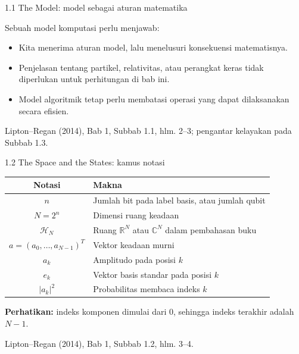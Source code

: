 \documentclass[aspectratio=169,11pt]{beamer}
\newcommand{\C}{\mathbb C}
\newcommand{\R}{\mathbb R}
\newcommand{\bookref}[1]{\par\vfill{\scriptsize\color{gray}Lipton--Regan (2014), Bab 1, #1.}}
\begin{document}
\begin{frame}{1.1 The Model: model sebagai aturan matematika}

Sebuah model komputasi perlu menjawab:
\begin{center}
\end{center}
\begin{itemize}
\item Kita menerima aturan model, lalu menelusuri konsekuensi matematisnya.
\item Penjelasan tentang partikel, relativitas, atau perangkat keras tidak diperlukan untuk perhitungan di bab ini.
\item Model algoritmik tetap perlu membatasi operasi yang dapat dilaksanakan secara efisien.
\end{itemize}
\bookref{Subbab 1.1, hlm. 2--3; pengantar kelayakan pada Subbab 1.3}

\end{frame}

\begin{frame}{1.2 The Space and the States: kamus notasi}

\begin{center}
\begin{tabular}{cl}\toprule
Notasi & Makna\\\midrule
$n$ & Jumlah bit pada label basis, atau jumlah qubit\\[1mm]
$N=2^n$ & Dimensi ruang keadaan\\[1mm]
$\mathcal H_N$ & Ruang $\R^N$ atau $\C^N$ dalam pembahasan buku\\[1mm]
$a=(a_0,\ldots,a_{N-1})^T$ & Vektor keadaan murni\\[1mm]
$a_k$ & Amplitudo pada posisi $k$\\[1mm]
$e_k$ & Vektor basis standar pada posisi $k$\\[1mm]
$|a_k|^2$ & Probabilitas membaca indeks $k$\\\bottomrule
\end{tabular}
\end{center}
\textbf{Perhatikan:} indeks komponen dimulai dari $0$, sehingga indeks terakhir adalah $N-1$.
\bookref{Subbab 1.2, hlm. 3--4}

\end{frame}
\end{document}
